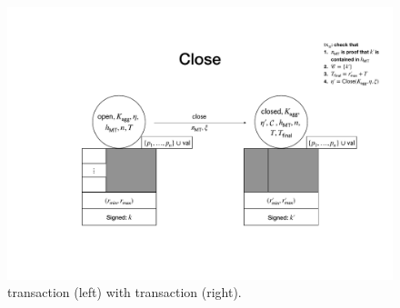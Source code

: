 \begin{figure}[t!]

  \centering


  \includegraphics[width=\textwidth/2]{figures/SM_open_closed.pdf}

  \caption{\mtxCCom{} transaction (left) with \mtxClose{}
    transaction (right).}
  \label{fig:SM_open_closed}

\end{figure}




